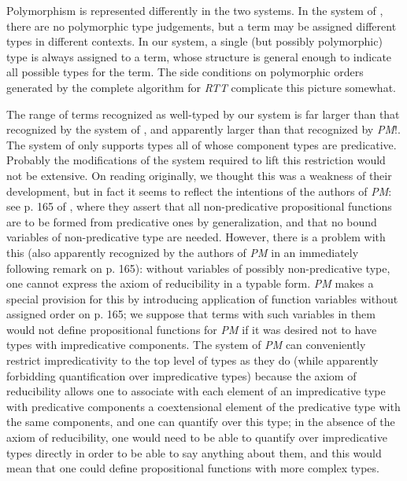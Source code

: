 \documentclass{article}
\begin{document}
Polymorphism is represented differently in the two systems.  In the
system of \cite{types40}, there are no polymorphic type judgements,
but a term may be assigned different types in different contexts.  In
our system, a single (but possibly polymorphic) type is always
assigned to a term, whose structure is general enough to indicate all
possible types for the term.  The side conditions on polymorphic
orders generated by the complete algorithm for {\em RTT\/} complicate
this picture somewhat.

The range of terms recognized as well-typed by our system is far
larger than that recognized by the system of \cite{types40}, and
apparently larger than that recognized by {\em PM\/}!.  The system of
\cite{types40} only supports types all of whose component types are
predicative.  Probably the modifications of the system required to
lift this restriction would not be extensive.  On reading
\cite{types40} originally, we thought this was a weakness of their
development, but in fact it seems to reflect the intentions of the
authors of {\em PM\/}: see p. 165 of \cite{principia}, where they
assert that all non-predicative propositional functions are to be
formed from predicative ones by generalization, and that no bound
variables of non-predicative type are needed.  However, there is a
problem with this (also apparently recognized by the authors of {\em
PM\/} in an immediately following remark on p. 165): without variables
of possibly non-predicative type, one cannot express the axiom of
reducibility in a typable form.  {\em PM\/} makes a special provision
for this by introducing application of function variables without
assigned order on p. 165; we suppose that terms with such variables in
them would not define propositional functions for {\em PM\/} if it was
desired not to have types with impredicative components.  The system
of {\em PM\/} can conveniently restrict impredicativity to the top
level of types as they do (while apparently forbidding quantification
over impredicative types) because the axiom of reducibility allows one
to associate with each element of an impredicative type with
predicative components a coextensional element of the predicative type
with the same components, and one can quantify over this type; in the
absence of the axiom of reducibility, one would need to be able to
quantify over impredicative types directly in order to be able to say
anything about them, and this would mean that one could define
propositional functions with more complex types.
\end{document}
